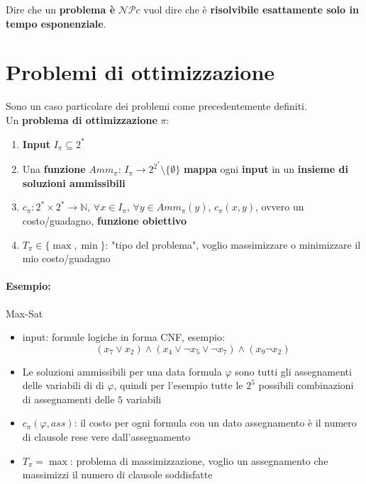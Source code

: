 \documentclass[11pt]{article}
\begin{document}
	Dire che un \textbf{problema è} $\mathcal{NP}c$ vuol dire che è \textbf{risolvibile esattamente solo in tempo esponenziale}.\\
	
	\newpage
	
	\section{Problemi di ottimizzazione}
	
	Sono un caso particolare dei problemi come precedentemente definiti.\\
	
	Un \textbf{problema di ottimizzazione} $\pi$: 
	\begin{enumerate}
		\item \textbf{Input} $I_\pi \subseteq 2^\ast$
		
		\item Una \textbf{funzione} $Amm_\pi: \, I_\pi \rightarrow 2^{2^\ast} \setminus \{\emptyset\}$ \textbf{mappa} ogni \textbf{input} in un \textbf{insieme di soluzioni ammissibili}
		
		\item $c_\pi: 2^\ast \times 2^\ast \rightarrow \mathbb{N}$, $\forall x \in I_\pi$, $\forall y \in Amm_\pi (y)$, $c_\pi (x,y)$, ovvero un costo/guadagno, \textbf{funzione obiettivo}
		
		\item $T_\pi \in \{\max, \min\}$: "tipo del problema", voglio massimizzare o minimizzare il mio costo/guadagno
	\end{enumerate}
	
	\paragraph{Esempio:} Max-Sat
	\begin{itemize}
		\item input: formule logiche in forma CNF, esempio:
		$$ (x_7 \vee x_2) \wedge (x_4 \vee \neg x_5 \vee \neg x_7) \wedge (x_9 \neg x_2) $$
		
		\item Le soluzioni ammissibili per una data formula $\varphi$ sono tutti gli assegnamenti delle variabili di di $\varphi$, quindi per l'esempio tutte le $2^5$ possibili combinazioni di assegnamenti delle $5$ variabili
		
		\item $c_\pi (\varphi, ass)$: il costo per ogni formula con un dato assegnamento è il numero di clausole rese vere dall'assegnamento
		
		\item $T_\pi = \max$: problema di massimizzazione, voglio un assegnamento che massimizzi il numero di clausole soddisfatte
	\end{itemize}
	
\end{document}
